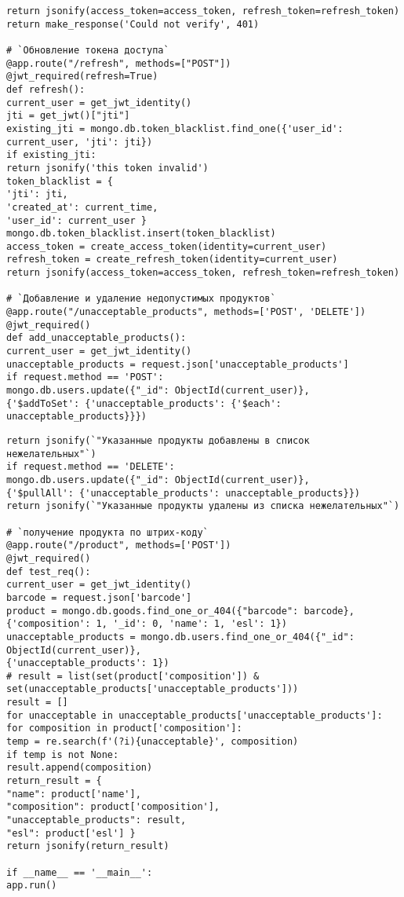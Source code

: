 \clearpage
{}
\begin{lstlisting}
return jsonify(access_token=access_token, refresh_token=refresh_token)
return make_response('Could not verify', 401)

# `Обновление токена доступа`
@app.route("/refresh", methods=["POST"])
@jwt_required(refresh=True)
def refresh():
current_user = get_jwt_identity()
jti = get_jwt()["jti"]
existing_jti = mongo.db.token_blacklist.find_one({'user_id': current_user, 'jti': jti})
if existing_jti:
return jsonify('this token invalid')
token_blacklist = {
'jti': jti,
'created_at': current_time,
'user_id': current_user }
mongo.db.token_blacklist.insert(token_blacklist)
access_token = create_access_token(identity=current_user)
refresh_token = create_refresh_token(identity=current_user)
return jsonify(access_token=access_token, refresh_token=refresh_token)

# `Добавление и удаление недопустимых продуктов`
@app.route("/unacceptable_products", methods=['POST', 'DELETE'])
@jwt_required()
def add_unacceptable_products():
current_user = get_jwt_identity()
unacceptable_products = request.json['unacceptable_products']
if request.method == 'POST':
mongo.db.users.update({"_id": ObjectId(current_user)},
{'$addToSet': {'unacceptable_products': {'$each': unacceptable_products}}})
\end{lstlisting}
\clearpage
{}
\begin{lstlisting}
return jsonify(`"Указанные продукты добавлены в список нежелательных"`)
if request.method == 'DELETE':
mongo.db.users.update({"_id": ObjectId(current_user)},
{'$pullAll': {'unacceptable_products': unacceptable_products}})
return jsonify(`"Указанные продукты удалены из списка нежелательных"`)

# `получение продукта по штрих-коду`
@app.route("/product", methods=['POST'])
@jwt_required()
def test_req():
current_user = get_jwt_identity()
barcode = request.json['barcode']
product = mongo.db.goods.find_one_or_404({"barcode": barcode},
{'composition': 1, '_id': 0, 'name': 1, 'esl': 1})
unacceptable_products = mongo.db.users.find_one_or_404({"_id": ObjectId(current_user)},
{'unacceptable_products': 1})
# result = list(set(product['composition']) & set(unacceptable_products['unacceptable_products']))
result = []
for unacceptable in unacceptable_products['unacceptable_products']:
for composition in product['composition']:
temp = re.search(f'(?i){unacceptable}', composition)
if temp is not None:
result.append(composition)
return_result = {
"name": product['name'],
"composition": product['composition'],
"unacceptable_products": result,
"esl": product['esl'] }
return jsonify(return_result)

if __name__ == '__main__':
app.run()
\end{lstlisting}
\clearpage